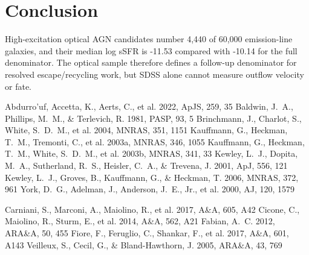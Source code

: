 \documentclass[twocolumn]{aastex631}
\begin{document}
\section{Conclusion}\label{sec:conclusion}
High-excitation optical AGN candidates number 4,440 of 60,000 emission-line galaxies, and their median log sSFR is -11.53 compared with -10.14 for the full denominator. The optical sample therefore defines a follow-up denominator for resolved escape/recycling work, but SDSS alone cannot measure outflow velocity or fate.


\begin{thebibliography}{}
 Abdurro'uf, Accetta, K., Aerts, C., et al. 2022, ApJS, 259, 35
 Baldwin, J.~A., Phillips, M.~M., \& Terlevich, R. 1981, PASP, 93, 5
 Brinchmann, J., Charlot, S., White, S.~D.~M., et al. 2004, MNRAS, 351, 1151
 Kauffmann, G., Heckman, T.~M., Tremonti, C., et al. 2003a, MNRAS, 346, 1055
 Kauffmann, G., Heckman, T.~M., White, S.~D.~M., et al. 2003b, MNRAS, 341, 33
 Kewley, L.~J., Dopita, M.~A., Sutherland, R.~S., Heisler, C.~A., \& Trevena, J. 2001, ApJ, 556, 121
 Kewley, L.~J., Groves, B., Kauffmann, G., \& Heckman, T. 2006, MNRAS, 372, 961
 York, D.~G., Adelman, J., Anderson, J.~E., Jr., et al. 2000, AJ, 120, 1579

 Carniani, S., Marconi, A., Maiolino, R., et al. 2017, A\&A, 605, A42
 Cicone, C., Maiolino, R., Sturm, E., et al. 2014, A\&A, 562, A21
 Fabian, A.~C. 2012, ARA\&A, 50, 455
 Fiore, F., Feruglio, C., Shankar, F., et al. 2017, A\&A, 601, A143
 Veilleux, S., Cecil, G., \& Bland-Hawthorn, J. 2005, ARA\&A, 43, 769
\end{thebibliography}
\end{document}
